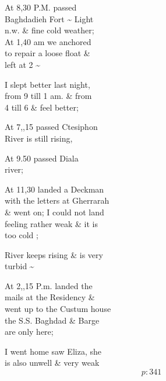 \documentclass{report}
\begin{document}
	\par{
 	At 8,30 P.M. passed\ \\Baghdadieh Fort \~{} Light\ \\n.w. \& fine cold weather;\ \\At 1,40 am we anchored\ \\to repair a loose float \&\ \\left at 2 \~{}\ \\
	}

	\par{
 	I slept better last night,\ \\from 9 till 1 am. \& from\ \\4 till 6 \& feel better;\ \\
	}

	\par{
 	At 7,,15 passed Ctesiphon\ \\River is still rising,\ \\
	}

	\par{
 	At 9.50 passed Diala\ \\river;\ \\
	}

	\par{
 	At 11,30 landed a Deckman\ \\with the letters at Gherrarah\ \\\& went on; I could not land\ \\feeling rather weak \& it is\ \\too cold ;\ \\
	}

	\par{
 	River keeps rising \& is very\ \\turbid \~{}\ \\
	}

	\par{
 	At 2,,15 P.m. landed the\ \\mails at the Residency \&\ \\went up to the Custum house\ \\the S.S. Baghdad \& Barge\ \\are only here;\ \\
	}

	\par{
 	I went home saw Eliza, she\ \\is also unwell \& very weak\ \\
  \[p: 341 \]

	}
\end{document}

